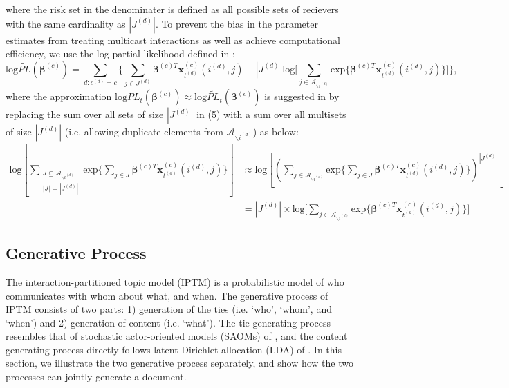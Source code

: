 \documentclass[a4paper]{article}
\begin{document}
where the risk set in the denominater is defined as all possible sets of recievers with the same cardinality as $|J^{(d)}|$. To prevent the bias in the parameter estimates from treating multicast interactions as well as achieve computational efficiency, we use the log-partial likelihood defined in \cite{PerryWolfe2012}:
\begin{equation}
\mbox{log}\widetilde{PL}(\boldsymbol{\beta}^{(c)})=\sum_{d: c^{(d)}=c} \Big\{\sum\limits_{j \in J^{(d)}}\boldsymbol{\beta}^{(c)T}\boldsymbol{x}^{(c)}_{t^{(d)}}(i^{(d)}, j)-|J^{(d)}|\mbox{log}\big[\sum_{j\in \mathcal{A}_{\backslash i^{(d)}}}\mbox{exp}\{\boldsymbol{\beta}^{(c)T}\boldsymbol{x}^{(c)}_{t^{(d)}}(i^{(d)}, j)\}\big]\Big\},
\end{equation}
where the approximation $\mbox{log}{PL}_t(\boldsymbol{\beta}^{(c)})\approx \mbox{log}\widetilde{PL}_t(\boldsymbol{\beta}^{(c)})$ is suggested in \cite{PerryWolfe2012} by replacing the sum over all sets of size $|J^{(d)}|$ in (5) with a sum over all multisets of size $|J^{(d)}|$ (i.e. allowing duplicate elements from $\mathcal{A}_{\backslash i^{(d)}}$) as below: 
\begin{equation}
\begin{split}
\mbox{log}[{\sum\limits_{\substack{J \subseteq \mathcal{A}_{\backslash i^{(d)}} \\|J|=|J^{(d)}|}} \mbox{exp}\{\sum\limits_{j \in J} \boldsymbol{\beta}^{(c)T}\boldsymbol{x}^{(c)}_{t^{(d)}}(i^{(d)}, j)\}}]&\approx
\mbox{log}[({\sum\limits_{j \in \mathcal{A}_{\backslash i^{(d)}} } \mbox{exp}\{\sum\limits_{j \in J} \boldsymbol{\beta}^{(c)T}\boldsymbol{x}^{(c)}_{t^{(d)}}(i^{(d)}, j)\}})^{|J^{(d)}|}]\\& = |J^{(d)}|\times\mbox{log}\big[\sum_{j\in \mathcal{A}_{\backslash i^{(d)}}}\mbox{exp}\{\boldsymbol{\beta}^{(c)T}\boldsymbol{x}^{(c)}_{t^{(d)}}(i^{(d)}, j)\}\big]
\end{split}
\end{equation}
\subsection{Generative Process}
The interaction-partitioned topic model (IPTM) is a probabilistic model of who communicates with whom about what, and when. The generative process of IPTM consists of two parts: 1) generation of the ties (i.e. `who', `whom', and `when') and 2) generation of content (i.e. `what'). The tie generating process resembles that of stochastic actor-oriented models (SAOMs) of \cite{snijders1996stochastic}, and the content generating process directly follows latent Dirichlet allocation (LDA) of \cite{Blei2003}. In this section, we illustrate the two generative process separately, and show how the two processes can jointly generate a document.
\end{document}
